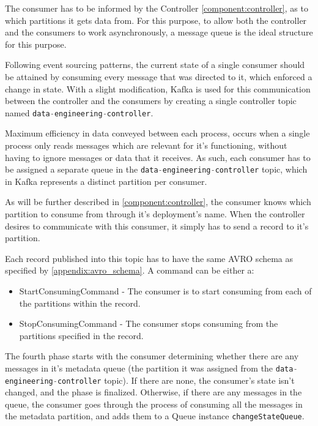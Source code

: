 The consumer has to be informed by the Controller \ref{component:controller}, as
to which partitions it gets data from. For this purpose, to allow both the
controller and the consumers to work asynchronously, a message queue is the
ideal structure for this purpose.

Following event sourcing patterns, the current state of a single consumer should
be attained by consuming every message that was directed to it, which enforced a
change in state. With a slight modification, Kafka is used for this
communication between the controller and the consumers by creating a single
controller topic named \lstinline[language=Python]{data-engineering-controller}.

Maximum efficiency in data conveyed between each process, occurs when a single
process only reads messages which are relevant for it's functioning, without
having to ignore messages or data that it receives. As such, each consumer has
to be assigned a separate queue in the
\lstinline[language=Python]{data-engineering-controller} topic, which in Kafka
represents a distinct partition per consumer.

As will be further described in \ref{component:controller}, the consumer knows
which partition to consume from through it's deployment's name. When the
controller desires to communicate with this consumer, it simply has to send a
record to it's partition. 

Each record published into this topic has to have the same AVRO schema as
specified by \ref{appendix:avro_schema}. A command can be either a:
\begin{itemize} \item StartConsumingCommand - The consumer is to start consuming
            from each of the partitions within the record.  \item
StopConsumingCommand - The consumer stops consuming from the partitions
specified in the record.  \end{itemize}

The fourth phase starts with the consumer determining whether there are any
messages in it's metadata queue (the partition it was assigned from the
\lstinline[language=Python]{data-engineering-controller} topic). If there are
none, the consumer's state isn't changed, and the phase is finalized. Otherwise,
if there are any messages in the queue, the consumer goes through the process of
consuming all the messages in the metadata partition, and adds them to a Queue
instance \lstinline[language=Python]{changeStateQueue}.

